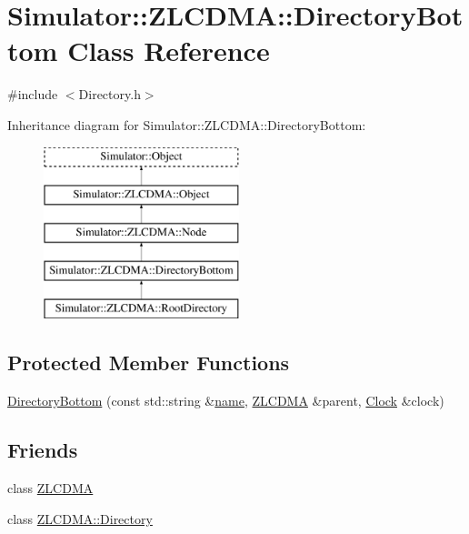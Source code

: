 \hypertarget{class_simulator_1_1_z_l_c_d_m_a_1_1_directory_bottom}{\section{Simulator\+:\+:Z\+L\+C\+D\+M\+A\+:\+:Directory\+Bottom Class Reference}
\label{class_simulator_1_1_z_l_c_d_m_a_1_1_directory_bottom}
}


{\ttfamily \#include $<$Directory.\+h$>$}

Inheritance diagram for Simulator\+:\+:Z\+L\+C\+D\+M\+A\+:\+:Directory\+Bottom\+:\begin{figure}[H]
\begin{center}
\leavevmode
\includegraphics[height=5.000000cm]{class_simulator_1_1_z_l_c_d_m_a_1_1_directory_bottom}
\end{center}
\end{figure}
\subsection*{Protected Member Functions}
\begin{DoxyCompactItemize}
\item 
\hyperlink{class_simulator_1_1_z_l_c_d_m_a_1_1_directory_bottom_a4b0b478e7235472e95318f6ae0c05b6e}{Directory\+Bottom} (const std\+::string \&\hyperlink{mtconf_8c_a8f8f80d37794cde9472343e4487ba3eb}{name}, \hyperlink{class_simulator_1_1_z_l_c_d_m_a}{Z\+L\+C\+D\+M\+A} \&parent, \hyperlink{class_simulator_1_1_clock}{Clock} \&clock)
\end{DoxyCompactItemize}
\subsection*{Friends}
\begin{DoxyCompactItemize}
\item 
class \hyperlink{class_simulator_1_1_z_l_c_d_m_a_1_1_directory_bottom_a1c09861c9a70825235b5f80518d478a1}{Z\+L\+C\+D\+M\+A}
\item 
class \hyperlink{class_simulator_1_1_z_l_c_d_m_a_1_1_directory_bottom_a1c8d2b869e248d4ee4a7b637c7252d62}{Z\+L\+C\+D\+M\+A\+::\+Directory}
\end{DoxyCompactItemize}
